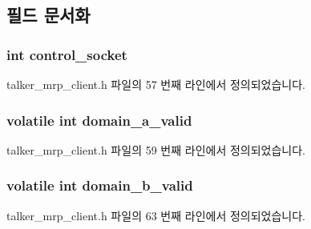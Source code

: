 \subsection{필드 문서화}
\subsubsection[{\texorpdfstring{control\+\_\+socket}{control_socket}}]{\setlength{\rightskip}{0pt plus 5cm}int control\+\_\+socket}\hypertarget{structmrp__talker__ctx_ab16a0c776c464dcfb5cf8a013a137647}{}\label{structmrp__talker__ctx_ab16a0c776c464dcfb5cf8a013a137647}


talker\+\_\+mrp\+\_\+client.\+h 파일의 57 번째 라인에서 정의되었습니다.

\subsubsection[{\texorpdfstring{domain\+\_\+a\+\_\+valid}{domain_a_valid}}]{\setlength{\rightskip}{0pt plus 5cm}volatile int domain\+\_\+a\+\_\+valid}\hypertarget{structmrp__talker__ctx_ae3be05692572d8c757174629541e2d91}{}\label{structmrp__talker__ctx_ae3be05692572d8c757174629541e2d91}


talker\+\_\+mrp\+\_\+client.\+h 파일의 59 번째 라인에서 정의되었습니다.

\subsubsection[{\texorpdfstring{domain\+\_\+b\+\_\+valid}{domain_b_valid}}]{\setlength{\rightskip}{0pt plus 5cm}volatile int domain\+\_\+b\+\_\+valid}\hypertarget{structmrp__talker__ctx_add1f58f9a17de764566dbf2e352b907f}{}\label{structmrp__talker__ctx_add1f58f9a17de764566dbf2e352b907f}


talker\+\_\+mrp\+\_\+client.\+h 파일의 63 번째 라인에서 정의되었습니다.

